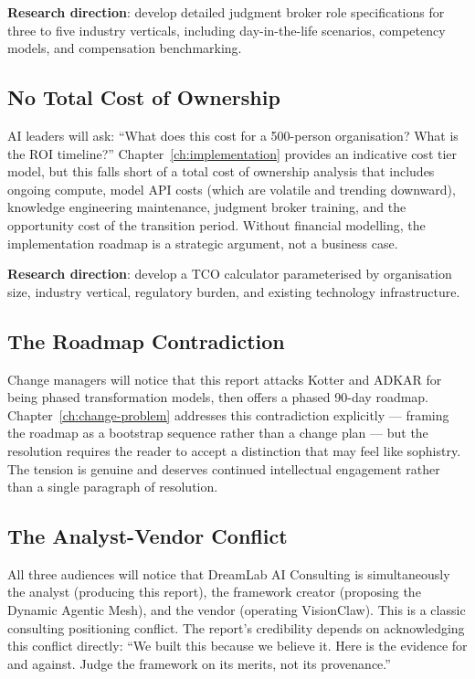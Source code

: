 \textbf{Research direction}: develop detailed judgment broker role specifications for three to five industry verticals, including day-in-the-life scenarios, competency models, and compensation benchmarking.

\subsection{No Total Cost of Ownership}

AI leaders will ask: ``What does this cost for a 500-person organisation? What is the ROI timeline?'' Chapter~\ref{ch:implementation} provides an indicative cost tier model, but this falls short of a total cost of ownership analysis that includes ongoing compute, model API costs (which are volatile and trending downward), knowledge engineering maintenance, judgment broker training, and the opportunity cost of the transition period. Without financial modelling, the implementation roadmap is a strategic argument, not a business case.

\textbf{Research direction}: develop a TCO calculator parameterised by organisation size, industry vertical, regulatory burden, and existing technology infrastructure.

\subsection{The Roadmap Contradiction}

Change managers will notice that this report attacks Kotter and ADKAR for being phased transformation models, then offers a phased 90-day roadmap. Chapter~\ref{ch:change-problem} addresses this contradiction explicitly --- framing the roadmap as a bootstrap sequence rather than a change plan --- but the resolution requires the reader to accept a distinction that may feel like sophistry. The tension is genuine and deserves continued intellectual engagement rather than a single paragraph of resolution.

\subsection{The Analyst-Vendor Conflict}

All three audiences will notice that DreamLab AI Consulting is simultaneously the analyst (producing this report), the framework creator (proposing the Dynamic Agentic Mesh), and the vendor (operating VisionClaw). This is a classic consulting positioning conflict. The report's credibility depends on acknowledging this conflict directly: ``We built this because we believe it. Here is the evidence for and against. Judge the framework on its merits, not its provenance.''

